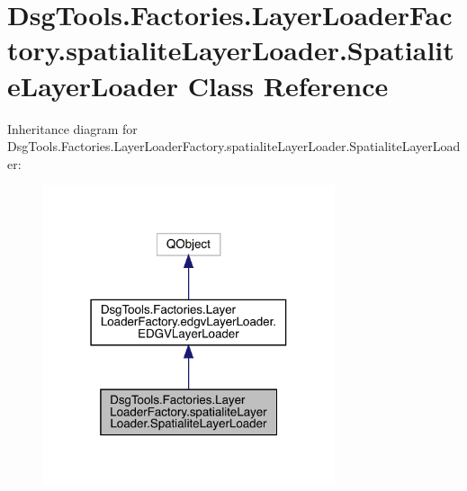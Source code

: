 \hypertarget{class_dsg_tools_1_1_factories_1_1_layer_loader_factory_1_1spatialite_layer_loader_1_1_spatialite_layer_loader}{}\section{Dsg\+Tools.\+Factories.\+Layer\+Loader\+Factory.\+spatialite\+Layer\+Loader.\+Spatialite\+Layer\+Loader Class Reference}
\label{class_dsg_tools_1_1_factories_1_1_layer_loader_factory_1_1spatialite_layer_loader_1_1_spatialite_layer_loader}


Inheritance diagram for Dsg\+Tools.\+Factories.\+Layer\+Loader\+Factory.\+spatialite\+Layer\+Loader.\+Spatialite\+Layer\+Loader\+:
\nopagebreak
\begin{figure}[H]
\begin{center}
\leavevmode
\includegraphics[width=243pt]{class_dsg_tools_1_1_factories_1_1_layer_loader_factory_1_1spatialite_layer_loader_1_1_spatialite_layer_loader__inherit__graph}
\end{center}
\end{figure}


